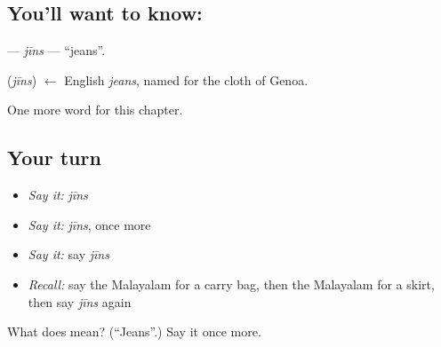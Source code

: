 \subsection*{You'll want to know: }
\textbf{} — \emph{jīns} — \textquotedblleft{}jeans\textquotedblright{}.

\begin{cousinweb}
\textbf{} (\emph{jīns}) $\leftarrow$ English \emph{jeans}, named for the cloth of Genoa.
\end{cousinweb}

\begin{grammarlens}[title={What you've built}]
One more word for this chapter.
\end{grammarlens}

\subsection*{Your turn}
\begin{itemize}
\raggedright
  \item \emph{Say it:} \emph{jīns}
  \item \emph{Say it:} \emph{jīns}, once more
  \item \emph{Say it:} say \emph{jīns}
  \item \emph{Recall:} say the Malayalam for a carry bag, then the Malayalam for a skirt, then say \emph{jīns} again
\end{itemize}

\begin{tcolorbox}[breakable,colback=teal!4,colframe=teal!35!black,title={Before you move on}]
What does  mean? (\textquotedblleft{}Jeans\textquotedblright{}.) Say it once more.
\end{tcolorbox}
